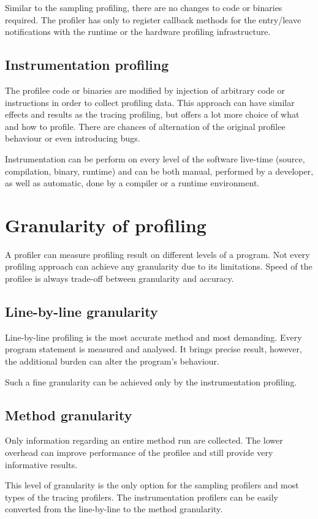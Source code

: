 Similar to the sampling profiling, there are no changes to code or binaries required. The profiler has only to register callback methods for the entry/leave notifications with the runtime or the hardware profiling infrastructure.

\subsection{Instrumentation profiling}
The profilee code or binaries are modified by injection of arbitrary code or instructions in order to collect profiling data. This approach can have similar effects and results as the tracing profiling, but offers a lot more choice of what and how to profile. There are chances of alternation of the original profilee behaviour or even introducing bugs.

Instrumentation can be perform on every level of the software live-time (source, compilation, binary, runtime) and can be both manual, performed by a developer, as well as automatic, done by a compiler or a runtime environment.

\section{Granularity of profiling}
A profiler can measure profiling result on different levels of a program. Not every profiling approach can achieve any granularity due to its limitations. Speed of the profilee is always trade-off between granularity and accuracy. 

\subsection{Line-by-line granularity}
Line-by-line profiling is the most accurate method and most demanding. Every program statement is measured and analysed. It brings precise result, however, the additional burden can alter the program's behaviour.

Such a fine granularity can be achieved only by the instrumentation profiling.

\subsection{Method granularity} 
Only information regarding an entire method run are collected. The lower overhead can improve performance of the profilee and still provide very informative results.

This level of granularity is the only option for the sampling profilers and most types of the tracing profilers. The instrumentation profilers can be easily converted from the line-by-line to the method granularity.

